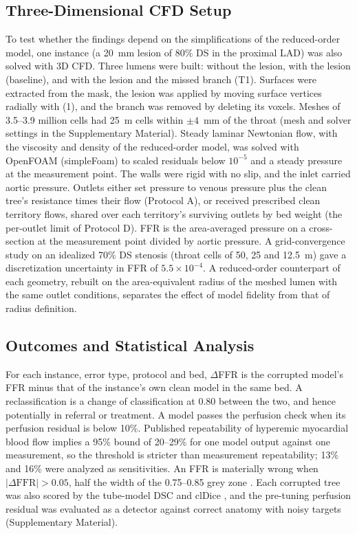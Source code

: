 \documentclass[journal,twoside,web]{ieeecolor}
\begin{document}
\subsection{Three-Dimensional CFD Setup}
To test whether the findings depend on the simplifications of the reduced-order model, one instance (a 20~mm lesion
of 80\% DS in the proximal LAD) was also solved with 3D CFD. Three lumens were built: without the lesion, with the lesion (baseline), and with the
lesion and the missed branch (T1). Surfaces were extracted from the mask, the
lesion was applied by moving surface vertices radially with (1), and the branch was removed by deleting its voxels.
Meshes of 3.5--3.9 million cells had 25~\textmu m cells within $\pm 4$~mm of the throat (mesh and solver settings in the Supplementary Material).
Steady laminar Newtonian flow, with the viscosity and density of the reduced-order model, was solved with OpenFOAM
(simpleFoam) to scaled residuals below $10^{-5}$ and a steady pressure at the measurement
point. The walls were rigid with no slip, and the inlet carried aortic pressure. Outlets either set pressure to venous pressure plus the clean tree's resistance times their flow (Protocol A), or received prescribed clean territory flows, shared over each territory's surviving outlets by bed weight (the per-outlet limit of Protocol D). FFR
is the area-averaged pressure on a cross-section at the measurement point divided by aortic pressure. A
grid-convergence study on an idealized 70\% DS stenosis (throat cells of 50, 25 and 12.5~\textmu m) gave a
discretization uncertainty in FFR of $5.5\times10^{-4}$. A reduced-order counterpart of each geometry, rebuilt on the
area-equivalent radius of the meshed lumen with the same outlet conditions, separates the effect of model fidelity
from that of radius definition.

\subsection{Outcomes and Statistical Analysis}
For each instance, error type, protocol and bed, $\Delta$FFR is the corrupted model's FFR minus that of the
instance's own clean model in the same bed. A reclassification is a change of classification at 0.80 between the two, and hence potentially
in referral or treatment. A model passes the perfusion check when its perfusion residual is below 10\%.
Published repeatability of hyperemic myocardial blood flow \cite{schindler2023,brown2018} implies a 95\% bound of
20--29\% for one model output against one measurement, so the threshold is stricter than measurement repeatability;
13\% and 16\% were analyzed as sensitivities. An FFR is materially wrong when $|\Delta\mathrm{FFR}| > 0.05$, half the width of the 0.75--0.85 grey zone
\cite{petraco2013}. Each corrupted tree was also scored by the tube-model DSC and clDice \cite{shit2021}, and the
pre-tuning perfusion residual was evaluated as a detector against correct anatomy with noisy targets
(Supplementary Material).
\end{document}
